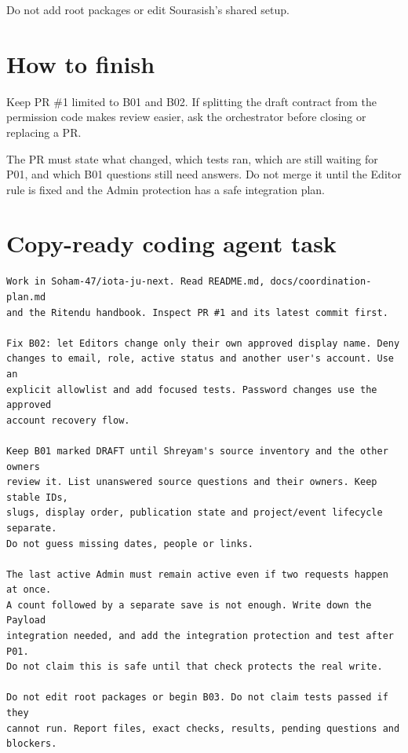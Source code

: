 \documentclass[11pt]{article}
\begin{document}
Do not add root packages or edit Sourasish's shared setup.

\section{How to finish}

Keep PR \#1 limited to B01 and B02. If splitting the draft contract from the permission code makes review easier, ask the orchestrator before closing or replacing a PR.

The PR must state what changed, which tests ran, which are still waiting for P01, and which B01 questions still need answers. Do not merge it until the Editor rule is fixed and the Admin protection has a safe integration plan.

\section{Copy-ready coding agent task}

\begin{verbatim}
Work in Soham-47/iota-ju-next. Read README.md, docs/coordination-plan.md
and the Ritendu handbook. Inspect PR #1 and its latest commit first.

Fix B02: let Editors change only their own approved display name. Deny
changes to email, role, active status and another user's account. Use an
explicit allowlist and add focused tests. Password changes use the approved
account recovery flow.

Keep B01 marked DRAFT until Shreyam's source inventory and the other owners
review it. List unanswered source questions and their owners. Keep stable IDs,
slugs, display order, publication state and project/event lifecycle separate.
Do not guess missing dates, people or links.

The last active Admin must remain active even if two requests happen at once.
A count followed by a separate save is not enough. Write down the Payload
integration needed, and add the integration protection and test after P01.
Do not claim this is safe until that check protects the real write.

Do not edit root packages or begin B03. Do not claim tests passed if they
cannot run. Report files, exact checks, results, pending questions and blockers.
\end{verbatim}
\end{document}
